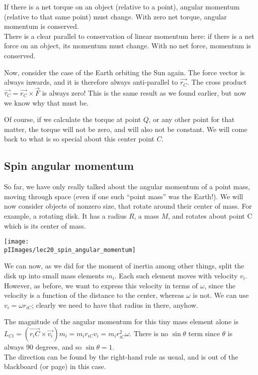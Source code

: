 If there is a net torque on an object (relative to a point), angular momentum (relative to that same point) must change. With zero net torque, angular momentum is conserved.\\
There is a clear parallel to conservation of linear momentum here: if there is a net force on an object, its momentum must change. With no net force, momentum is conserved.

Now, consider the case of the Earth orbiting the Sun again. The force vector is always inwards, and it is therefore always anti-parallel to $\vec{r_C}$. The cross product $\vec{\tau_C} = \vec{r_C} \times \vec{F}$ is always zero! This is the same result as we found earlier, but now we know why that must be.

Of course, if we calculate the torque at point $Q$, or any other point for that matter, the torque will not be zero, and will also not be constant. We will come back to what is so special about this center point $C$.

\subsection{Spin angular momentum}

So far, we have only really talked about the angular momentum of a point mass, moving through space (even if one such ``point mass'' was the Earth!). We will now consider objects of nonzero size, that rotate around their center of mass. For example, a rotating disk. It has a radius $R$, a mass $M$, and rotates about point C which is its center of mass.

\begin{center}
\texttt{[image: \\pIImages/lec20\_spin\_angular\_momentum]}
\end{center}

We can now, as we did for the moment of inertia among other things, split the disk up into small mass elements $m_i$. Each such element moves with velocity $v_i$. However, as before, we want to express this velocity in terms of $\omega$, since the velocity is a function of the distance to the center, whereas $\omega$ is not. We can use $v_i = \omega r_{iC}$; clearly we need to have that radius in there, anyhow.

The magnitude of the angular momentum for this tiny mass element alone is $L_{Ci} = (\vec{r_iC} \times \vec{v_i}) m_i = m_i r_{iC} v_i = m_i r_{iC}^2 \omega$. There is no $\sin \theta$ term since $\theta$ is always 90 degrees, and so $\sin \theta = 1$.\\
The direction can be found by the right-hand rule as usual, and is out of the blackboard (or page) in this case.

